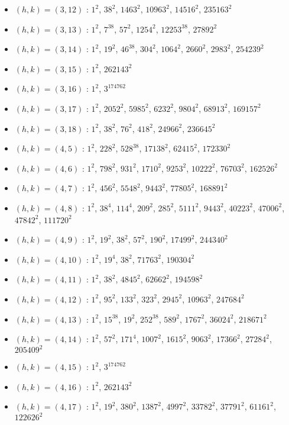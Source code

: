 \begin{itemize}
\item $(h,k)=(3,12)$ : $1^{2}$, $38^{2}$, $1463^{2}$, $10963^{2}$, $14516^{2}$, $235163^{2}$
\item $(h,k)=(3,13)$ : $1^{2}$, $7^{38}$, $57^{2}$, $1254^{2}$, $12253^{38}$, $27892^{2}$
\item $(h,k)=(3,14)$ : $1^{2}$, $19^{2}$, $46^{38}$, $304^{2}$, $1064^{2}$, $2660^{2}$, $2983^{2}$, $254239^{2}$
\item $(h,k)=(3,15)$ : $1^{2}$, $262143^{2}$
\item $(h,k)=(3,16)$ : $1^{2}$, $3^{174762}$
\item $(h,k)=(3,17)$ : $1^{2}$, $2052^{2}$, $5985^{2}$, $6232^{2}$, $9804^{2}$, $68913^{2}$, $169157^{2}$
\item $(h,k)=(3,18)$ : $1^{2}$, $38^{2}$, $76^{2}$, $418^{2}$, $24966^{2}$, $236645^{2}$
\item $(h,k)=(4,5)$ : $1^{2}$, $228^{2}$, $528^{38}$, $17138^{2}$, $62415^{2}$, $172330^{2}$
\item $(h,k)=(4,6)$ : $1^{2}$, $798^{2}$, $931^{2}$, $1710^{2}$, $9253^{2}$, $10222^{2}$, $76703^{2}$, $162526^{2}$
\item $(h,k)=(4,7)$ : $1^{2}$, $456^{2}$, $5548^{2}$, $9443^{2}$, $77805^{2}$, $168891^{2}$
\item $(h,k)=(4,8)$ : $1^{2}$, $38^{4}$, $114^{4}$, $209^{2}$, $285^{2}$, $5111^{2}$, $9443^{2}$, $40223^{2}$, $47006^{2}$, $47842^{2}$, $111720^{2}$
\item $(h,k)=(4,9)$ : $1^{2}$, $19^{2}$, $38^{2}$, $57^{2}$, $190^{2}$, $17499^{2}$, $244340^{2}$
\item $(h,k)=(4,10)$ : $1^{2}$, $19^{4}$, $38^{2}$, $71763^{2}$, $190304^{2}$
\item $(h,k)=(4,11)$ : $1^{2}$, $38^{2}$, $4845^{2}$, $62662^{2}$, $194598^{2}$
\item $(h,k)=(4,12)$ : $1^{2}$, $95^{2}$, $133^{2}$, $323^{2}$, $2945^{2}$, $10963^{2}$, $247684^{2}$
\item $(h,k)=(4,13)$ : $1^{2}$, $15^{38}$, $19^{2}$, $252^{38}$, $589^{2}$, $1767^{2}$, $36024^{2}$, $218671^{2}$
\item $(h,k)=(4,14)$ : $1^{2}$, $57^{2}$, $171^{4}$, $1007^{2}$, $1615^{2}$, $9063^{2}$, $17366^{2}$, $27284^{2}$, $205409^{2}$
\item $(h,k)=(4,15)$ : $1^{2}$, $3^{174762}$
\item $(h,k)=(4,16)$ : $1^{2}$, $262143^{2}$
\item $(h,k)=(4,17)$ : $1^{2}$, $19^{2}$, $380^{2}$, $1387^{2}$, $4997^{2}$, $33782^{2}$, $37791^{2}$, $61161^{2}$, $122626^{2}$

\end{itemize}
